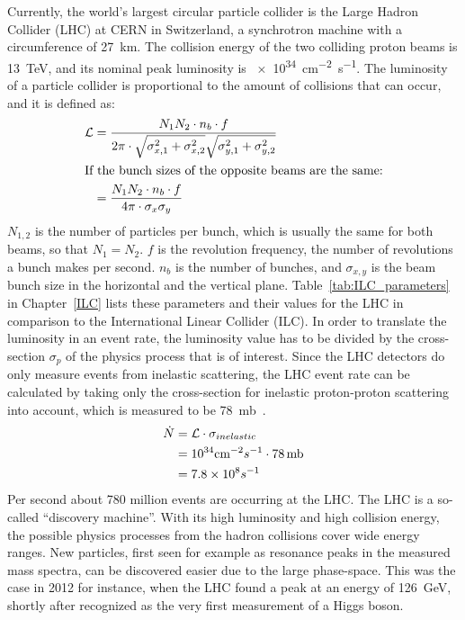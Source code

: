 Currently, the world's largest circular particle collider is the Large Hadron Collider (LHC) at CERN in Switzerland, a synchrotron machine with a circumference of \SI{27}{\kilo\meter}.
The collision energy of the two colliding proton beams is \SI{13}{\TeV}, and its nominal peak luminosity \lumi is \SI{e34}{\centi\meter^{-2}\second^{-1}}.
The luminosity of a particle collider is proportional to the amount of collisions that can occur, and it is defined as:
\begin{align}
 \mathcal{L}&=\frac{N_1N_2 \cdot n_b \cdot f}{2\pi \cdot \sqrt{\sigma^2_{x,1}+\sigma^2_{x,2}} \sqrt{\sigma^2_{y,1}+\sigma^2_{y,2}}}\\
 \intertext{If the bunch sizes of the opposite beams are the same:}
 &=\frac{N_1N_2 \cdot n_b \cdot f}{4\pi \cdot \sigma_x \sigma_y}
\end{align}
$N_{1,2}$ is the number of particles per bunch, which is usually the same for both beams, so that $N_1=N_2$.
$f$ is the revolution frequency, the number of revolutions a bunch makes per second.
$n_{b}$ is the number of bunches, and $\sigma_{x,y}$ is the beam bunch size in the horizontal and the vertical plane.
Table~\ref{tab:ILC_parameters} in Chapter~\ref{ILC} lists these parameters and their values for the LHC in comparison to the International Linear Collider (ILC).
In order to translate the luminosity in an event rate, the luminosity value has to be divided by the cross-section $\sigma_p$ of the physics process that is of interest.
Since the LHC detectors do only measure events from inelastic scattering, the LHC event rate can be calculated by taking only the cross-section for inelastic proton-proton scattering into account, which is measured to be \SI{78}{\milli\barn}~\cite{inelXSection}.
\begin{align}
 \dot{N}&=\mathcal{L}\cdot\sigma_{inelastic}\\
 &=10^{34} \textrm{cm}^{-2}s^{-1} \cdot 78\textrm{\,mb}\\
 &=7.8\times 10^8 s^{-1}
\end{align}
Per second about 780 million events are occurring at the LHC.
The LHC is a so-called ``discovery machine''.
With its high luminosity and high collision energy, the possible physics processes from the hadron collisions cover wide energy ranges.  
New particles, first seen for example as resonance peaks in the measured mass spectra, can be discovered easier due to the large phase-space.
This was the case in 2012 for instance, when the LHC found a peak at an energy of \SI{126}{\GeV}, shortly after recognized as the very first measurement of a Higgs boson.~\cite{Higgs}

